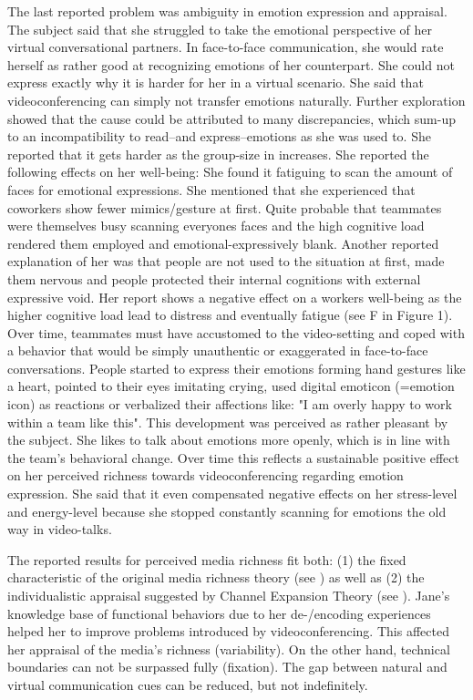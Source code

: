 \documentclass[man]{apa7}
\begin{document}
The last reported problem was ambiguity in emotion expression and appraisal. The subject said that she struggled to take the emotional perspective of her virtual conversational partners. In face-to-face communication, she would rate herself as rather good at recognizing emotions of her counterpart. She could not express exactly why it is harder for her in a virtual scenario. She said that videoconferencing can simply not transfer emotions naturally. Further exploration showed that the cause could be attributed to many discrepancies, which sum-up to an incompatibility to read–and express–emotions as she was used to. She reported that it gets harder as the group-size in increases. She reported the following effects on her well-being: She found it fatiguing to scan the amount of faces for emotional expressions. She mentioned that she experienced that coworkers show fewer mimics/gesture at first. Quite probable that teammates were themselves busy scanning everyones faces and the high cognitive load rendered them employed and emotional-expressively blank. Another reported explanation of her was that people are not used to the situation at first, made them nervous and people protected their internal cognitions with external expressive void. Her report shows a negative effect on a workers well-being as the higher cognitive load lead to distress and eventually fatigue (see F in Figure 1). Over time, teammates must have accustomed to the video-setting and coped with a behavior that would be simply unauthentic or exaggerated in face-to-face conversations. People started to express their emotions forming hand gestures like a heart, pointed to their eyes imitating crying, used digital emoticon (=emotion icon) as reactions or verbalized their affections like: "I am overly happy to work within a team like this". This development was perceived as rather pleasant by the subject. She likes to talk about emotions more openly, which is in line with the team's behavioral change. Over time this reflects a sustainable positive effect on her perceived richness towards videoconferencing regarding emotion expression. She said that it even compensated negative effects on her stress-level and energy-level because she stopped constantly scanning for emotions the old way in video-talks.

The reported results for perceived media richness fit both: (1) the fixed characteristic of the original media richness theory (see \cite{daft1983information}) as well as (2) the individualistic appraisal suggested by Channel Expansion Theory (see \cite{Carlson1999}). Jane's knowledge base of functional behaviors due to her de-/encoding experiences helped her to improve problems introduced by videoconferencing. This affected her appraisal of the media's richness (variability). On the other hand, technical boundaries can not be surpassed fully (fixation). The gap between natural and virtual communication cues can be reduced, but not indefinitely.
\end{document}
